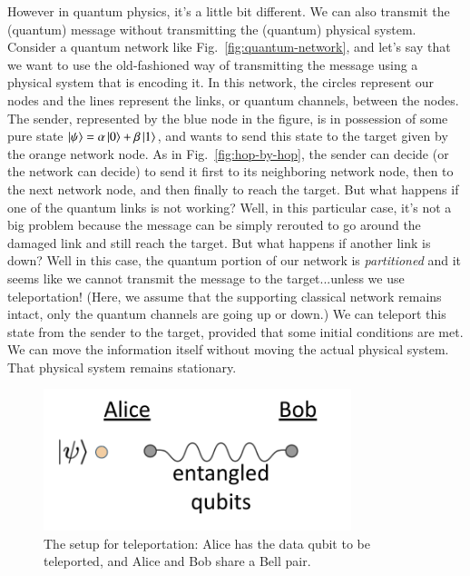 However in quantum physics, it's a little bit different. We can also transmit the (quantum) message without transmitting the (quantum) physical system. Consider a quantum network like Fig.~\ref{fig:quantum-network}, and let's say that we want to use the old-fashioned way of transmitting the message using a physical system that is encoding it. In this network, the circles represent our nodes and the lines represent the links, or quantum channels, between the nodes. The sender, represented by the blue node in the figure, is in possession of some pure state $\left| \psi \right\rangle = \alpha\left| 0 \right\rangle+\beta\left| 1 \right\rangle$, and  wants to send this state to the target given by the orange network node. As in Fig.~\ref{fig:hop-by-hop}, the sender can decide (or the network can decide) to send it first to its neighboring network node, then to the next network node, and then finally to reach the target. But what happens if one of the quantum links is not working? Well, in this particular case, it's not a big problem because the message can be simply rerouted to go around the damaged link and still reach the target. But what happens if another link is down? Well in this case, the quantum portion of our network is \emph{partitioned} and it seems like we cannot transmit the message to the target...unless we use teleportation! (Here, we assume that the supporting classical network remains intact, only the quantum channels are going up or down.) We can teleport this state from the sender to the target, provided that some initial conditions are met. We can move the information itself without moving the actual physical system. That physical system remains stationary.

\begin{figure}[H]
    \centering
    \includegraphics[width=0.8\textwidth]{lesson8/teleportation-setup.png}
        \caption{The setup for teleportation: Alice has the data qubit to be teleported, and Alice and Bob share a Bell pair.}
    \label{fig:teleportation-setup}
\end{figure}

